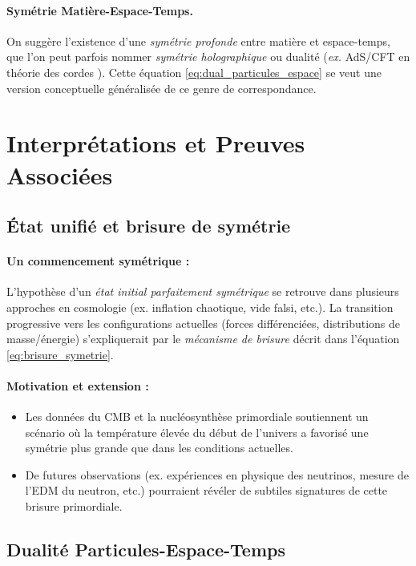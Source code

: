 \documentclass[12pt]{article}
\begin{document}
\paragraph{Symétrie Matière-Espace-Temps.}
On suggère l'existence d'une \emph{symétrie profonde} entre matière et espace-temps, 
que l'on peut parfois nommer \emph{symétrie holographique} ou dualité 
(\emph{ex.} AdS/CFT en théorie des cordes \cite{maldacena1999large}). 
Cette équation \eqref{eq:dual_particules_espace} se veut une version conceptuelle 
généralisée de ce genre de correspondance.

\section{Interprétations et Preuves Associées}

\subsection{État unifié et brisure de symétrie}

\paragraph{Un commencement symétrique :} 
L'hypothèse d'un \emph{état initial parfaitement symétrique} se retrouve dans 
plusieurs approches en cosmologie (ex. inflation chaotique, vide falsi, etc.). 
La transition progressive vers les configurations actuelles (forces différenciées, 
distributions de masse/énergie) s'expliquerait par le \emph{mécanisme de brisure} 
décrit dans l'équation \eqref{eq:brisure_symetrie}.

\paragraph{Motivation et extension :}
\begin{itemize}
    \item Les données du CMB et la nucléosynthèse primordiale soutiennent un scénario 
          où la température élevée du début de l'univers a favorisé une symétrie plus grande 
          que dans les conditions actuelles.
    \item De futures observations (ex. expériences en physique des neutrinos, mesure 
          de l'EDM du neutron, etc.) pourraient révéler de subtiles signatures 
          de cette brisure primordiale.
\end{itemize}

\subsection{Dualité Particules-Espace-Temps}
\end{document}
